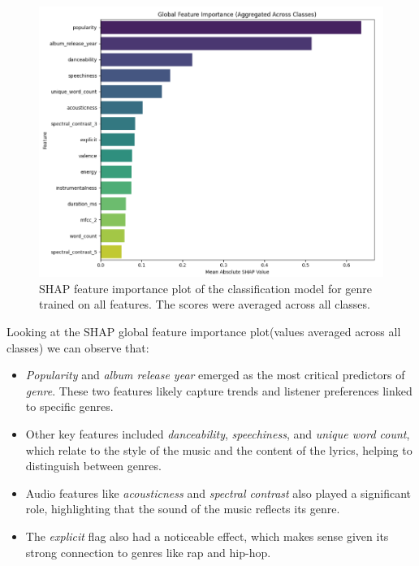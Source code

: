 \begin{center}
\begin{figure}[H]
  \centering
  \includegraphics[width=5in]{img/feature_importance_genre_clf.png}
  \caption{SHAP feature importance plot of the classification model for genre
  trained on all features. The scores were averaged across all classes.}
  \label{Figure:fig_eh}
\end{figure}
\end{center}

Looking at the SHAP global feature importance plot(values averaged across all
classes) we can observe that:
\begin{itemize}
  \item \textit{Popularity} and \textit{album release year} emerged as the most
    critical predictors of \textit{genre}. These two features likely capture
    trends and listener preferences linked to specific genres.
  \item Other key features included \textit{danceability},
    \textit{speechiness}, and \textit{unique word count}, which relate to the
    style of the music and the content of the lyrics, helping to distinguish
    between genres. \item Audio features like \textit{acousticness} and
    \textit{spectral contrast} also played a significant role, highlighting
    that the sound of the music reflects its genre. 
  \item The \textit{explicit} flag also had a noticeable effect, which makes
    sense given its strong connection to genres like rap and hip-hop.

\end{itemize}

